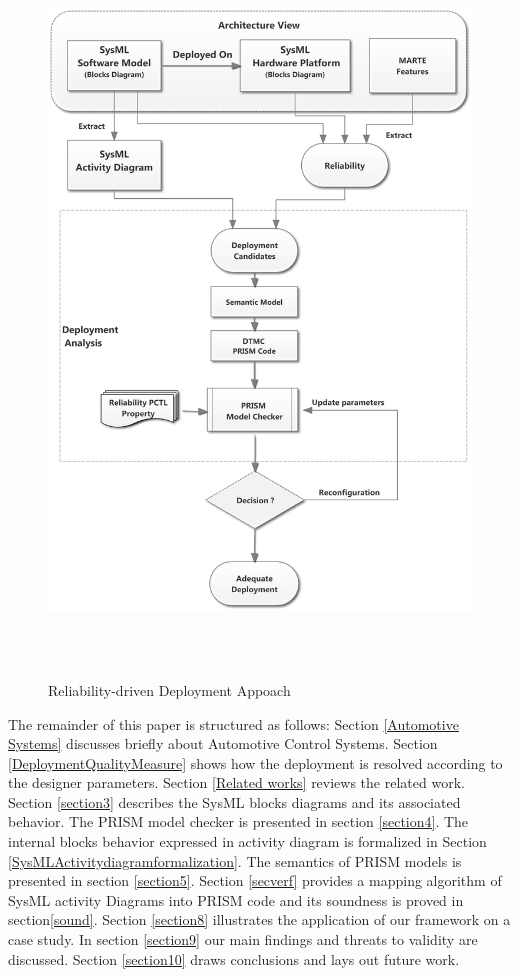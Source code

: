 \documentclass[3p,times,procedia,authoryear,round]{elsarticle}
\begin{document}
\begin{figure}[!ht]
	\centering
	\includegraphics[width=410pt, height =550pt]{Approach.jpg}
	\caption{Reliability-driven Deployment Appoach}	
	\label{approach}
\end{figure}

The remainder of this paper is structured as follows: Section \ref{Automotive Systems} discusses briefly about Automotive Control Systems. Section \ref{DeploymentQualityMeasure} shows how the deployment is resolved according to the designer parameters. Section \ref{Related works} reviews the related work. Section \ref{section3} describes the SysML blocks diagrams and its associated behavior. The PRISM model checker is presented in section \ref{section4}. The internal blocks behavior expressed in activity diagram is formalized in Section \ref{SysMLActivitydiagramformalization}. The
semantics of PRISM models is presented in section \ref{section5}. Section \ref{secverf} provides a mapping algorithm of SysML activity Diagrams into PRISM code and its soundness is proved in section\ref{sound}. Section \ref{section8} illustrates the application of our framework on a case study. In section \ref{section9} our main findings and threats to validity are discussed. Section \ref{section10} draws conclusions and lays out future work.
\end{document}
